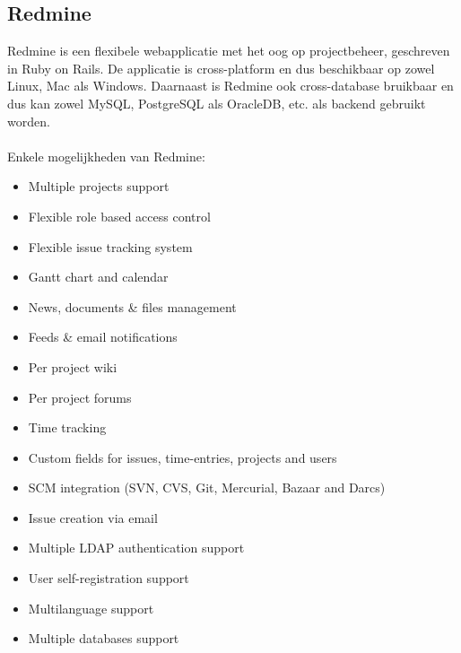 \subsection{Redmine}
Redmine is een flexibele webapplicatie met het oog op projectbeheer, geschreven in Ruby on Rails. De applicatie is cross-platform en dus beschikbaar op zowel Linux, Mac als Windows. Daarnaast is Redmine ook cross-database bruikbaar en dus kan zowel MySQL, PostgreSQL als OracleDB, etc. als backend gebruikt worden.\\\\
%
Enkele mogelijkheden van Redmine:
\begin{itemize}
    \item Multiple projects support
    \item Flexible role based access control
    \item Flexible issue tracking system
    \item Gantt chart and calendar
    \item News, documents \& files management
    \item Feeds \& email notifications
    \item Per project wiki
    \item Per project forums
    \item Time tracking
    \item Custom fields for issues, time-entries, projects and users
    \item SCM integration (SVN, CVS, Git, Mercurial, Bazaar and Darcs)
    \item Issue creation via email
    \item Multiple LDAP authentication support
    \item User self-registration support
    \item Multilanguage support
    \item Multiple databases support
\end{itemize}

